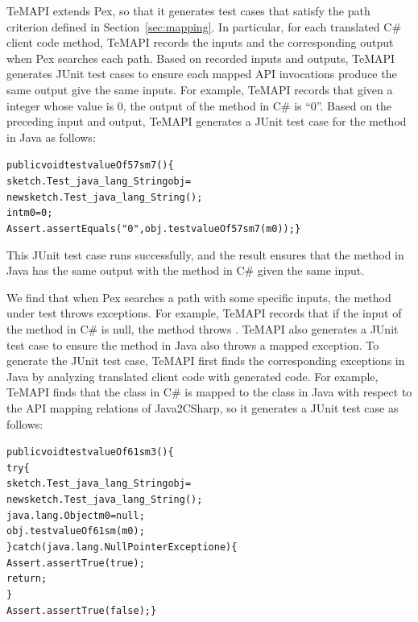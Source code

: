 TeMAPI extends Pex, so that it generates test cases that satisfy the path criterion defined in Section~\ref{sec:mapping}. In particular, for each translated C\# client code method, TeMAPI records the inputs and the corresponding output when Pex searches each path. Based on recorded inputs and outputs, TeMAPI generates JUnit test cases to ensure each mapped API invocations produce the same output give the same inputs.
For example, TeMAPI records that given a integer whose value is 0, the output of the  method in C\# is ``0''. Based on the preceding input and output, TeMAPI generates a JUnit test case for the  method in Java as follows:

\begin{CodeOut}%
\begin{alltt}
public void testvalueOf57sm7()\{
  sketch.Test_java_lang_String obj =
      new sketch.Test_java_lang_String();
  int m0 = 0;
  Assert.assertEquals("0", obj.testvalueOf57sm7(m0));\}
\end{alltt}
\end{CodeOut}

This JUnit test case runs successfully, and the result ensures that the  method in Java has the same output with the  method in C\# given the same input.


We find that when Pex searches a path with some specific inputs, the method under test throws exceptions.
For example, TeMAPI records that if the input of the  method in C\# is null, the method throws . TeMAPI also generates a JUnit test case to ensure the  method in Java also throws a mapped exception. To generate the JUnit test case, TeMAPI first finds the corresponding exceptions in Java by analyzing translated client code with generated code. For example, TeMAPI finds that the  class in C\# is mapped to the  class in Java with respect to the API mapping relations of Java2CSharp, so it generates a JUnit test case as follows:

\begin{CodeOut}%
\begin{alltt}
 public void testvalueOf61sm3()\{
   try\{
     sketch.Test_java_lang_String obj =
           new sketch.Test_java_lang_String();
     java.lang.Object m0 = null;
     obj.testvalueOf61sm(m0);
   \}catch(java.lang.NullPointerException e)\{
     Assert.assertTrue(true);
     return;
   \}
   Assert.assertTrue(false); \}
\end{alltt}
\end{CodeOut}


